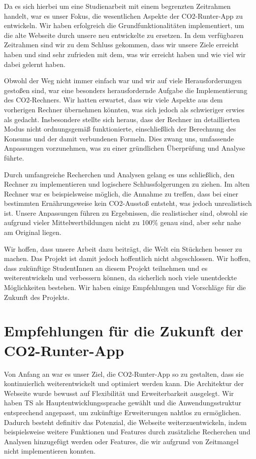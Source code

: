 Da es sich hierbei um eine Studienarbeit mit einem begrenzten Zeitrahmen handelt, war es unser Fokus, die wesentlichen Aspekte der CO2-Runter-App zu entwickeln. Wir haben erfolgreich die Grundfunktionalitäten implementiert, um die alte Webseite durch unsere neu entwickelte zu ersetzen. In dem verfügbaren Zeitrahmen sind wir zu dem Schluss gekommen, dass wir unsere Ziele erreicht haben und sind sehr zufrieden mit dem, was wir erreicht haben und wie viel wir dabei gelernt haben.

Obwohl der Weg nicht immer einfach war und wir auf viele Herausforderungen gestoßen sind, war eine besonders herausfordernde Aufgabe die Implementierung des CO2-Rechners. Wir hatten erwartet, dass wir viele Aspekte aus dem vorherigen Rechner übernehmen könnten, was sich jedoch als schwieriger erwies als gedacht. Insbesondere stellte sich heraus, dass der Rechner im detaillierten Modus nicht ordnungsgemäß funktionierte, einschließlich der Berechnung des Konsums und der damit verbundenen Formeln. Dies zwang uns, umfassende Anpassungen vorzunehmen, was zu einer gründlichen Überprüfung und Analyse führte.

Durch umfangreiche Recherchen und Analysen gelang es uns schließlich, den Rechner zu implementieren und logischere Schlussfolgerungen zu ziehen. Im alten Rechner war es beispielsweise möglich, die Annahme zu treffen, dass bei einer bestimmten Ernährungsweise kein CO2-Ausstoß entsteht, was jedoch unrealistisch ist. Unsere Anpassungen führen zu Ergebnissen, die realistischer sind, obwohl sie aufgrund vieler Mittelwertbildungen nicht zu 100\% genau sind, aber sehr nahe am Original liegen.

Wir hoffen, dass unsere Arbeit dazu beiträgt, die Welt ein Stückchen besser zu machen. Das Projekt ist damit jedoch hoffentlich nicht abgeschlossen. Wir hoffen, dass zukünftige StudentInnen an diesem Projekt teilnehmen und es weiterentwickeln und verbessern können, da sicherlich noch viele unentdeckte Möglichkeiten bestehen. Wir haben einige Empfehlungen und Vorschläge für die Zukunft des Projekts.

\section{Empfehlungen für die Zukunft der CO2-Runter-App}

Von Anfang an war es unser Ziel, die CO2-Runter-App so zu gestalten, dass sie kontinuierlich weiterentwickelt und optimiert werden kann. Die Architektur der Webseite wurde bewusst auf Flexibilität und Erweiterbarkeit ausgelegt. Wir haben \acl{TS} als Hauptentwicklungssprache gewählt und die Anwendungsstruktur entsprechend angepasst, um zukünftige Erweiterungen nahtlos zu ermöglichen. Dadurch besteht definitiv das Potenzial, die Webseite weiterzuentwickeln, indem beispielsweise weitere Funktionen und Features durch zusätzliche Recherchen und Analysen hinzugefügt werden oder Features, die wir aufgrund von Zeitmangel nicht implementieren konnten.

